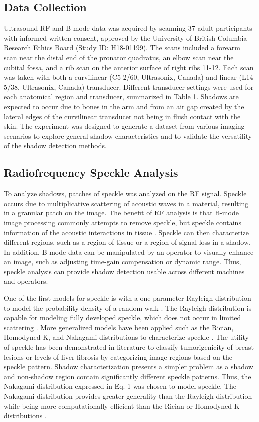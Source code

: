 \documentclass[preprint,5p,authoryear]{elsarticle}
\begin{document}
\subsection*{Data Collection}
Ultrasound RF and B-mode data was acquired by scanning 37 adult participants with informed written consent, approved by the University of British Columbia Research Ethics Board (Study ID: H18-01199). The scans included a forearm scan near the distal end of the pronator quadratus, an elbow scan near the cubital fossa, and a rib scan on the anterior surface of right ribs 11-12. Each scan was taken with both a curvilinear (C5-2/60, Ultrasonix, Canada) and linear (L14-5/38, Ultrasonix, Canada) transducer. Different transducer settings were used for each anatomical region and transducer, summarized in Table 1. Shadows are expected to occur due to bones in the arm and from an air gap created by the lateral edges of the curvilinear transducer not being in flush contact with the skin. The experiment was designed to generate a dataset from various imaging scenarios to explore general shadow characteristics and to validate the versatility of the shadow detection methods. 

\subsection*{Radiofrequency Speckle Analysis}      
To analyze shadows, patches of speckle was analyzed on the RF signal. Speckle occurs due to multiplicative scattering of acoustic waves in a material, resulting in a granular patch on the image. The benefit of RF analysis is that B-mode image processing commonly attempts to remove speckle, but speckle contains information of the acoustic interactions in tissue \citep{Burckhardt1978}. Speckle can then characterize different regions, such as a region of tissue or a region of signal loss in a shadow. In addition, B-mode data can be manipulated by an operator to visually enhance an image, such as adjusting time-gain compensation or dynamic range. Thus, speckle analysis can provide shadow detection usable across different machines and operators.

One of the first models for speckle is with a one-parameter Rayleigh distribution to model the probability density of a random walk \citep{Burckhardt1978}. The Rayleigh distribution is capable for modeling fully developed speckle, which does not occur in limited scattering \citep{Tuthill1988}. More generalized models have been applied such as the Rician, Homodyned-K, and Nakagami distributions to characterize speckle \citep{Destrempes2010}. The utility of speckle has been demonstrated in literature to classify tumorigenicity of breast lesions \citep{Byra2016} or levels of liver fibrosis \citep{Ho2012} by categorizing image regions based on the speckle pattern. Shadow characterization presents a simpler problem as a shadow and non-shadow region contain significantly different speckle patterns. Thus, the Nakagami distribution expressed in Eq. 1 was chosen to model speckle. The Nakagami distribution provides greater generality than the Rayleigh distribution while being more computationally efficient than the Rician or Homodyned K distributions \citep{Destrempes2010}.
\end{document}
